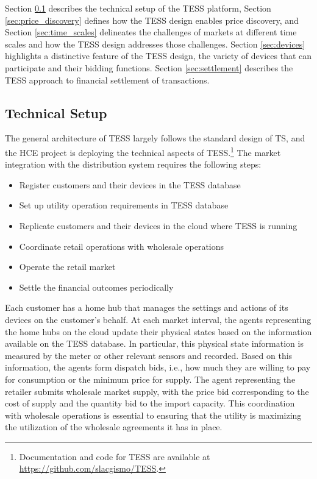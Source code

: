 Section \ref{sec:technical_setup} describes the technical setup of the TESS platform, Section \ref{sec:price_discovery} defines how the TESS design enables price discovery, and Section \ref{sec:time_scales} delineates the challenges of markets at different time scales and how the TESS design addresses those challenges. Section \ref{sec:devices} highlights a distinctive feature of the TESS design, the variety of devices that can participate and their bidding functions. Section \ref{sec:settlement} describes the TESS approach to financial settlement of transactions.

\subsection{Technical Setup}\label{sec:technical_setup}

The general architecture of TESS largely follows the standard design of TS, and the HCE project is deploying the technical aspects of TESS.\footnote{Documentation and code for TESS are available at \url{https://github.com/slacgismo/TESS}.} The market integration with the distribution system requires the following steps:

\begin{itemize}
    \item Register customers and their devices in the TESS database
    \item Set up utility operation requirements in TESS database
    \item Replicate customers and their devices in the cloud where TESS is running
    \item Coordinate retail operations with wholesale operations
    \item Operate the retail market
    \item Settle the financial outcomes periodically
\end{itemize}

Each customer has a home hub that manages the settings and actions of its devices on the customer's behalf. At each market interval, the agents representing the home hubs on the cloud update their physical states based on the information available on the TESS database. In particular, this physical state information is measured by the meter or other relevant sensors and recorded. Based on this information, the agents form dispatch bids, i.e., how much they are willing to pay for consumption or the minimum price for supply. 
The agent representing the retailer submits wholesale market supply, with the price bid corresponding to the cost of supply and the quantity bid to the import capacity. This coordination with wholesale operations is essential to ensuring that the utility is maximizing the utilization of the wholesale agreements it has in place.

